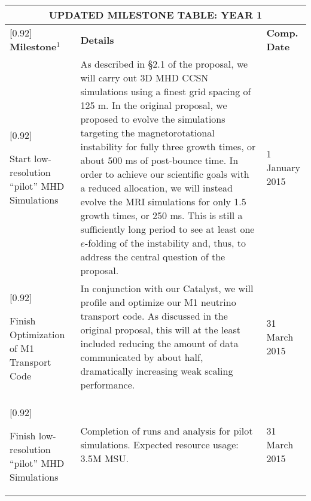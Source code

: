 \documentclass[11pt]{article}
\begin{document}
\begin{table}[t]
\begin{tabular}{|p{2.00in}|p{5.6in}|p{1.20in}|}
\multicolumn{3}{c}{\textbf{UPDATED MILESTONE TABLE: YEAR 1}}\\
\hline\hline
\rowcolor{Gold1}[0.92\tabcolsep]
\textbf{Milestone$^1$}&\textbf{Details}&
\textbf{Comp. Date}\\
\hline\hline
\rowcolor{Aquamarine1}[0.92\tabcolsep]
\raggedright
Start low-resolution ``pilot'' MHD Simulations&
%
As described in \S2.1 of the proposal, we will carry out 3D MHD CCSN simulations using a finest grid spacing of 125 m.
In the original proposal, we proposed to evolve the simulations targeting the magnetorotational instability for fully three growth times, or about 500 ms of post-bounce time.
In order to achieve our scientific goals with a reduced allocation, we will instead evolve the MRI simulations for only 1.5 growth times, or 250 ms.  
This is still a sufficiently long period to see at least one $e$-folding of the instability and, thus, to address the central question of the proposal.
&
%
\raggedright
1 January 2015 \tabularnewline
\hline

\rowcolor{LemonChiffon1}[0.92\tabcolsep]
\raggedright
Finish Optimization of M1 Transport Code&
%
In conjunction with our Catalyst, we will profile and optimize our M1 neutrino transport code.
As discussed in the original proposal, this will at the least included reducing the amount of data 
communicated by about half, dramatically increasing weak scaling performance.
&
%
\raggedright
31 March 2015 \tabularnewline
\hline
\rowcolor{Aquamarine1}[0.92\tabcolsep]
\raggedright
Finish low-resolution ``pilot'' MHD Simulations&
%
Completion of runs and analysis for pilot simulations.  
Expected resource usage: 3.5M MSU.
&
%
\raggedright
31 March 2015 \tabularnewline
\hline


\end{tabular}
\end{table}
\end{document}
